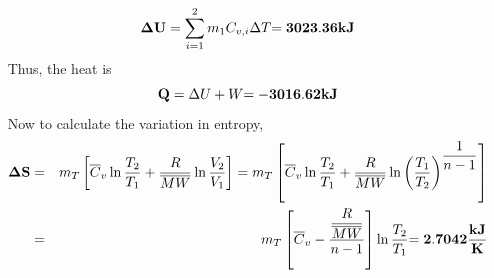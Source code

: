 \documentclass[calculator,steamtables,allquestions,datasheet]{exam_newMarcus2}
\newcommand{\frc}{\displaystyle\frac}
\begin{document}
\begin{question}
{\begin{displaymath}
{\bf \Delta U} = \sum\limits_{i=1}^{2} m_{1}C_{v,i} \Delta T {\bf = 3023.36 kJ}
\end{displaymath}~
Thus, the heat is 
\begin{displaymath}
{\bf Q} =\Delta U + W {\bf = -3016.62 kJ}
\end{displaymath}~
Now to calculate the variation in entropy,
\begin{eqnarray}
{\bf \Delta S} &=& m_{T}\left[\overline{C}_{v}\ln\frc{T_{2}}{T_{1}}+\frc{R}{\overline{MW}}\ln\frc{V_{2}}{V_{1}}\right] = m_{T}\left[\overline{C}_{v}\ln\frc{T_{2}}{T_{1}}+\frc{R}{\overline{MW}}\ln\left(\frc{T_{1}}{T_{2}}\right)^{\frc{1}{n-1}}\right]\nonumber  \nonumber \\
               &=& m_{T}\left[\overline{C}_{v}-\frc{\frc{R}{\overline{MW}}}{n-1}\right]\ln\frc{T_{2}}{T_{1}} {\bf = 2.7042 \frc{kJ}{K}}\nonumber 
\end{eqnarray}~
}

\end{question}

\clearpage
\end{document}
